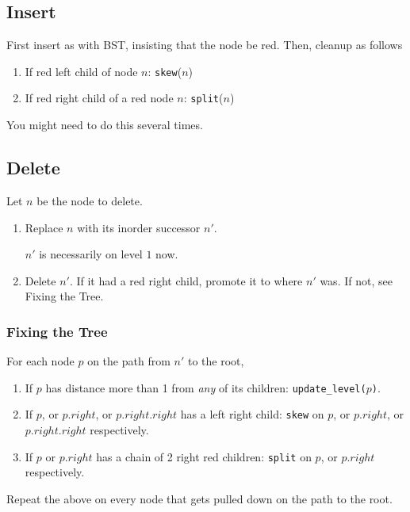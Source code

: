 \documentclass[12pt, letterpaper]{article}
\begin{document}
\begin{multicols*}{3}
        \subsection{Insert}
        First insert as with BST, insisting that the node be red. Then, cleanup as follows
        \begin{enumerate}
            \item If red left child of node $n$: \texttt{skew}($n$)
            \item If red right child of a red node $n$: \texttt{split}($n$)
        \end{enumerate}

        You might need to do this several times.


        
        \subsection{Delete}
        Let $n$ be the node to delete.

        \begin{enumerate}
            \item Replace $n$ with its inorder successor $n'$.

                $n'$ is necessarily on level $1$ now.
                
            \item Delete $n'$. If it had a red right child, promote it to where $n'$ was. If not, see Fixing the Tree.
        \end{enumerate}

        \subsubsection{Fixing the Tree}
        For each node $p$ on the path from $n'$ to the root,
        \begin{enumerate}
            \item If $p$ has distance more than 1 from {\it any} of its children: \texttt{update\_level($p$)}.
            \item If $p$, or $p.right$, or $p.right.right$ has a left right child:
            \texttt{skew} on $p$, or $p.right$, or $p.right.right$ respectively.
            \item If $p$ or $p.right$ has a chain of 2 right red children: \texttt{split} on $p$, or $p.right$ respectively.
        \end{enumerate}
        Repeat the above on every node that gets pulled down on the path to the root.
        




\end{multicols*}
\end{document}
